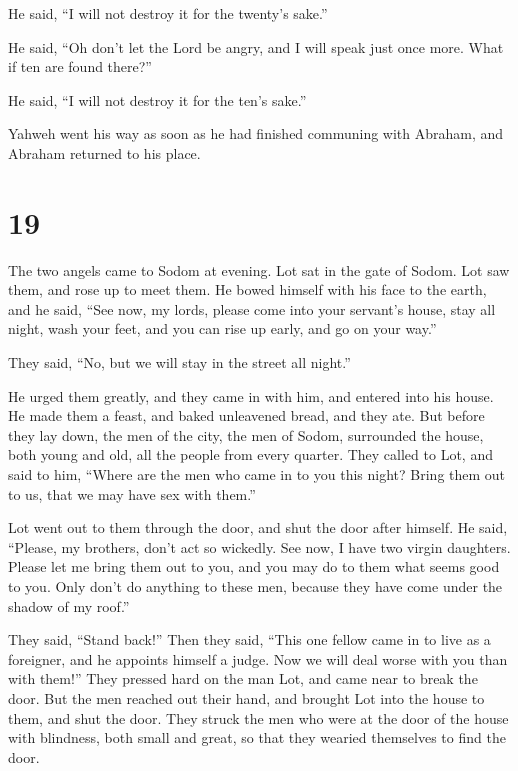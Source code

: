 He said, ``I will not destroy it for the twenty's sake.''

 He said, ``Oh don't let the Lord be angry, and I will
speak just once more. What if ten are found there?''

He said, ``I will not destroy it for the ten's sake.''

 Yahweh went his way as soon as he had finished communing
with Abraham, and Abraham returned to his place.

\hypertarget{section-18}{%
\section{19}\label{section-18}}

 The two angels came to Sodom at evening. Lot sat in the
gate of Sodom. Lot saw them, and rose up to meet them. He bowed himself
with his face to the earth,  and he said, ``See now, my
lords, please come into your servant's house, stay all night, wash your
feet, and you can rise up early, and go on your way.''

They said, ``No, but we will stay in the street all night.''

 He urged them greatly, and they came in with him, and
entered into his house. He made them a feast, and baked unleavened
bread, and they ate.  But before they lay down, the men of
the city, the men of Sodom, surrounded the house, both young and old,
all the people from every quarter.  They called to Lot, and
said to him, ``Where are the men who came in to you this night? Bring
them out to us, that we may have sex with them.''

 Lot went out to them through the door, and shut the door
after himself.  He said, ``Please, my brothers, don't act so
wickedly.  See now, I have two virgin daughters. Please let
me bring them out to you, and you may do to them what seems good to you.
Only don't do anything to these men, because they have come under the
shadow of my roof.''

 They said, ``Stand back!'' Then they said, ``This one
fellow came in to live as a foreigner, and he appoints himself a judge.
Now we will deal worse with you than with them!'' They pressed hard on
the man Lot, and came near to break the door.  But the men
reached out their hand, and brought Lot into the house to them, and shut
the door.  They struck the men who were at the door of the
house with blindness, both small and great, so that they wearied
themselves to find the door.

